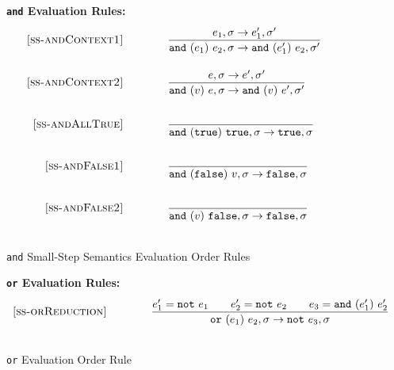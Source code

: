 \documentclass{article}
\begin{document}
\begin{figure}[H]\label{fig:andRules}
\caption{{\tt and} Small-Step Semantics Evaluation Order Rules}
{\bf {\tt and} Evaluation Rules:} \\
\[
\begin{array}{r@{\qquad\qquad}l}
\ssrule{ss-andContext1}{
  \sstep{e_1}{\sigma}{e_1'}{\sigma'}
}{
  \sstep{\ande{e_1}{e_2}}{\sigma}{\ande{e_1'}{e_2}}{\sigma'}
}
\ssrule{ss-andContext2}{
  \sstep{e}{\sigma}{e'}{\sigma'}
}{
  \sstep{\ande{v}{e}}{\sigma}{\ande{v}{e'}}{\sigma'}
}
\ssrule{ss-andAllTrue}{
}{
  \sstep{\ande{\true}{\true}}{\sigma}{\true}{\sigma}
}
\ssrule{ss-andFalse1}{
}{
  \sstep{\ande{\false}{v}}{\sigma}{\false}{\sigma}
}
\ssrule{ss-andFalse2}{
}{
  \sstep{\ande{v}{\false}}{\sigma}{\false}{\sigma}
}
\end{array}
\]
\end{figure}

\begin{figure}[H]\label{fig:orRules}
\caption{{\tt or} Evaluation Order Rule}
{\bf {\tt or} Evaluation Rules:} \\
\[
\begin{array}{r@{\qquad\qquad}l}
\ssrule{ss-orReduction}{
  e_1'=\note{e_1} \qquad e_2'=\note{e_2} \qquad e_3=\ande{e_1'}{e_2'}
}{
  \sstep{\ore{e_1}{e_2}}{\sigma}{\note{e_3}}{\sigma}
}
\end{array}
\]
\end{figure}
\end{document}
